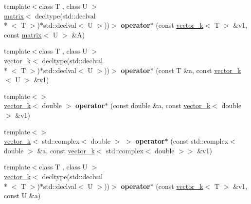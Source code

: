 \begin{DoxyCompactItemize}
\item 
\hypertarget{namespacekeycpp_a7a43db361f4a3128d89ad6a1db86686c}{{\footnotesize template$<$class T , class U $>$ }\\\hyperlink{classkeycpp_1_1matrix}{matrix}$<$ decltype(std\-::declval\\*
$<$ T $>$)$\ast$std\-::declval$<$ U $>$))$>$ {\bfseries operator$\ast$} (const \hyperlink{classkeycpp_1_1vector__k}{vector\-\_\-k}$<$ T $>$ \&v1, const \hyperlink{classkeycpp_1_1matrix}{matrix}$<$ U $>$ \&A)}\label{namespacekeycpp_a7a43db361f4a3128d89ad6a1db86686c}

\item 
\hypertarget{namespacekeycpp_a6e4d2d791a5cbcbcf90de5da2250b4c8}{{\footnotesize template$<$class T , class U $>$ }\\\hyperlink{classkeycpp_1_1vector__k}{vector\-\_\-k}$<$ decltype(std\-::declval\\*
$<$ T $>$)$\ast$std\-::declval$<$ U $>$))$>$ {\bfseries operator$\ast$} (const T \&a, const \hyperlink{classkeycpp_1_1vector__k}{vector\-\_\-k}$<$ U $>$ \&v1)}\label{namespacekeycpp_a6e4d2d791a5cbcbcf90de5da2250b4c8}

\item 
\hypertarget{namespacekeycpp_ac7a042d0e04e0c610b5798017c8196d9}{{\footnotesize template$<$$>$ }\\\hyperlink{classkeycpp_1_1vector__k}{vector\-\_\-k}$<$ double $>$ {\bfseries operator$\ast$} (const double \&a, const \hyperlink{classkeycpp_1_1vector__k}{vector\-\_\-k}$<$ double $>$ \&v1)}\label{namespacekeycpp_ac7a042d0e04e0c610b5798017c8196d9}

\item 
\hypertarget{namespacekeycpp_a06de45116e1111f3aca66cd18565e9ba}{{\footnotesize template$<$$>$ }\\\hyperlink{classkeycpp_1_1vector__k}{vector\-\_\-k}$<$ std\-::complex$<$ double $>$ $>$ {\bfseries operator$\ast$} (const std\-::complex$<$ double $>$ \&a, const \hyperlink{classkeycpp_1_1vector__k}{vector\-\_\-k}$<$ std\-::complex$<$ double $>$$>$ \&v1)}\label{namespacekeycpp_a06de45116e1111f3aca66cd18565e9ba}

\item 
\hypertarget{namespacekeycpp_a05f53ae281350225540bf5b4f4d1259b}{{\footnotesize template$<$class T , class U $>$ }\\\hyperlink{classkeycpp_1_1vector__k}{vector\-\_\-k}$<$ decltype(std\-::declval\\*
$<$ T $>$)$\ast$std\-::declval$<$ U $>$))$>$ {\bfseries operator$\ast$} (const \hyperlink{classkeycpp_1_1vector__k}{vector\-\_\-k}$<$ T $>$ \&v1, const U \&a)}\label{namespacekeycpp_a05f53ae281350225540bf5b4f4d1259b}


\end{DoxyCompactItemize}
